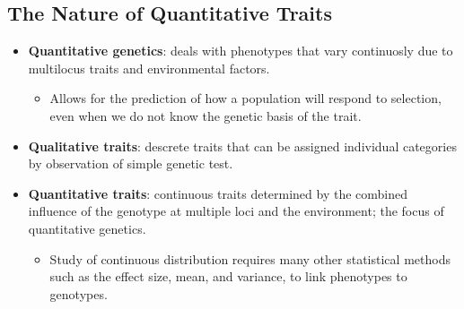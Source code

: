 \documentclass[12pt,a4paper]{article}
\begin{document}
\subsection{The Nature of Quantitative Traits}
\begin{itemize}
    \item \textbf{Quantitative genetics}: deals with phenotypes that vary continuosly due to multilocus traits and environmental factors.
        \begin{itemize}
            \item Allows for the prediction of how a population will respond to selection, even when we do not know the genetic basis of the trait.
        \end{itemize}
    \item \textbf{Qualitative traits}: descrete traits that can be assigned individual categories by observation of simple genetic test.
    \item \textbf{Quantitative traits}: continuous traits determined by the combined influence of the genotype at multiple loci and the environment; the focus of quantitative genetics.
        \begin{itemize}
            \item Study of continuous distribution requires many other statistical methods such as the effect size, mean, and variance, to link phenotypes to genotypes.
        \end{itemize}
\end{itemize}
\end{document}

